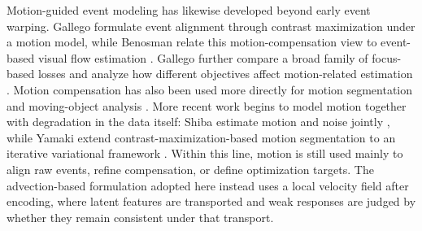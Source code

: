 \documentclass[runningheads]{llncs}
\begin{document}
Motion-guided event modeling has likewise developed beyond early event warping. 
Gallego \etal formulate event alignment through contrast maximization under a motion model, while Benosman \etal relate this motion-compensation view to event-based visual flow estimation \cite{gallego2018unifying,benosman2013event}. 
Gallego \etal further compare a broad family of focus-based losses and analyze how different objectives affect motion-related estimation \cite{gallego2019focus}. 
Motion compensation has also been used more directly for motion segmentation and moving-object analysis \cite{stoffregen2019event,mitrokhin2018event}.
More recent work begins to model motion together with degradation in the data itself: Shiba \etal estimate motion and noise jointly \cite{shiba2025simultaneous}, while Yamaki \etal extend contrast-maximization-based motion segmentation to an iterative variational framework \cite{yamaki2025iterative}. 
Within this line, motion is still used mainly to align raw events, refine compensation, or define optimization targets. 
The advection-based formulation adopted here instead uses a local velocity field after encoding, where latent features are transported and weak responses are judged by whether they remain consistent under that transport.
\end{document}
